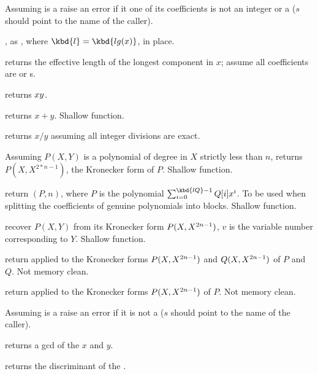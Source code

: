  Assuming  is a 
raise an error if it one of its coefficients is not an integer or a 
($s$ should point to the name of the caller).

, as , where
$\kbd{l} = \kbd{lg(x)}$, in place.

 returns the effective length of the longest
component in $x$; assume all coefficients are  or s.

 returns $x\*y$.

 returns $x+y$. Shallow function.

 returns $x/y$ assuming all integer
divisions are exact.

 Assuming $P(X,Y)$ is a polynomial
of degree in $X$ strictly less than $n$, returns $P(X,X^{2*n-1})$, the
Kronecker form of $P$. Shallow function.

 return
$(P, n)$, where $P$ is the polynomial
$\sum_{i = 0}^{\kbd{lQ} - 1} Q[i] x^i$. To be used when splitting
the coefficients of genuine polynomials into blocks. Shallow function.

 recover $P(X,Y)$
from its Kronecker form $P(X,X^{2\*n-1})$, $v$ is the variable number
corresponding to $Y$. Shallow function.

 return 
applied to the Kronecker forms $P(X,X^{2\*n-1})$ and $Q(X,X^{2\*n-1})$
of $P$ and $Q$. Not memory clean.

 return 
applied to the Kronecker forms $P(X,X^{2\*n-1})$
of $P$. Not memory clean.


 Assuming  is a 
raise an error if it is not a  ($s$ should point to the name of the
caller).



 returns a gcd of the  $x$ and $y$.

 returns the discriminant of the 
.

